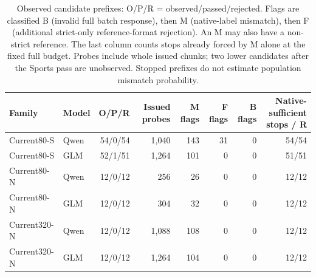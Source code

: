 \begin{table}[t]
\centering\small
\caption{Observed candidate prefixes: O/P/R = observed/passed/rejected. Flags are classified B (invalid full batch response), then M (native-label mismatch), then F (additional strict-only reference-format rejection). An M may also have a non-strict reference. The last column counts stops already forced by M alone at the fixed full budget. Probes include whole issued chunks; two lower candidates after the Sports pass are unobserved. Stopped prefixes do not estimate population mismatch probability.}
\label{tab:rejection_evidence}
\begin{tabular}{llrrrrrr}
\toprule
Family & Model & O/P/R & Issued probes & M flags & F flags & B flags & \shortstack{Native-sufficient\\stops / R} \\
\midrule
Current80-S & Qwen & 54/0/54 & 1,040 & 143 & 31 & 0 & 54/54 \\
Current80-S & GLM & 52/1/51 & 1,264 & 101 & 0 & 0 & 51/51 \\
Current80-N & Qwen & 12/0/12 & 256 & 26 & 0 & 0 & 12/12 \\
Current80-N & GLM & 12/0/12 & 304 & 32 & 0 & 0 & 12/12 \\
Current320-N & Qwen & 12/0/12 & 1,088 & 108 & 0 & 0 & 12/12 \\
Current320-N & GLM & 12/0/12 & 1,264 & 104 & 0 & 0 & 12/12 \\
\bottomrule
\end{tabular}
\end{table}
